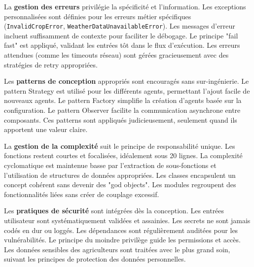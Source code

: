 



La \textbf{gestion des erreurs} privilégie la spécificité et l'information. Les exceptions personnalisées sont définies pour les erreurs métier spécifiques (\texttt{InvalidCropError}, \texttt{WeatherDataUnavailableError}). Les messages d'erreur incluent suffisamment de contexte pour faciliter le débogage. Le principe "fail fast" est appliqué, validant les entrées tôt dans le flux d'exécution. Les erreurs attendues (comme les timeouts réseau) sont gérées gracieusement avec des stratégies de retry appropriées.

Les \textbf{patterns de conception} appropriés sont encouragés sans sur-ingénierie. Le pattern Strategy est utilisé pour les différents agents, permettant l'ajout facile de nouveaux agents. Le pattern Factory simplifie la création d'agents basée sur la configuration. Le pattern Observer facilite la communication asynchrone entre composants. Ces patterns sont appliqués judicieusement, seulement quand ils apportent une valeur claire.

La \textbf{gestion de la complexité} suit le principe de responsabilité unique. Les fonctions restent courtes et focalisées, idéalement sous 20 lignes. La complexité cyclomatique est maintenue basse par l'extraction de sous-fonctions et l'utilisation de structures de données appropriées. Les classes encapsulent un concept cohérent sans devenir des "god objects". Les modules regroupent des fonctionnalités liées sans créer de couplage excessif.

Les \textbf{pratiques de sécurité} sont intégrées dès la conception. Les entrées utilisateur sont systématiquement validées et assainies. Les secrets ne sont jamais codés en dur ou loggés. Les dépendances sont régulièrement auditées pour les vulnérabilités. Le principe du moindre privilège guide les permissions et accès. Les données sensibles des agriculteurs sont traitées avec le plus grand soin, suivant les principes de protection des données personnelles.
